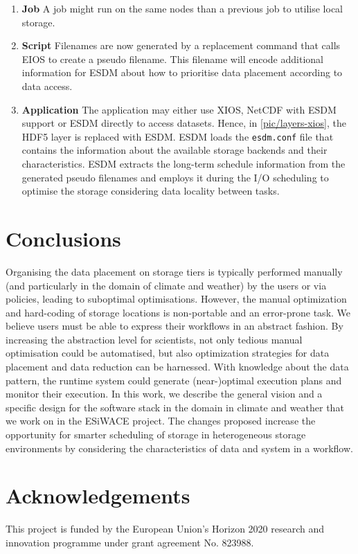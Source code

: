 \documentclass{superfri}
\newcommand{\bnl}[1]{\textcolor{green}{BNL: #1}}
\begin{document}
\begin{enumerate}
  \item \textbf{Job}
  A job might run on the same nodes than a previous job to utilise local storage.

  \item \textbf{Script}
  Filenames are now generated by a replacement command that calls EIOS to create a pseudo filename.
  This filename will encode additional information for ESDM about how to prioritise data placement according to data access.

  \item \textbf{Application}
  The application may either use XIOS, NetCDF with ESDM support or ESDM directly to access datasets.
  Hence, in \cref{pic/layers-xios}, the HDF5 layer is replaced with ESDM.
  ESDM loads the \texttt{esdm.conf} file that contains the information about the available storage backends and their characteristics.
  ESDM extracts the long-term schedule information from the generated pseudo filenames and employs it during the I/O scheduling to optimise the storage considering data locality between tasks.

\end{enumerate}

\section{Conclusions}
\label{sec:conclusions}

Organising the data placement on storage tiers is typically performed manually (and particularly in the domain of climate and weather) by the users or via policies, leading to suboptimal optimisations.
However, the manual optimization and hard-coding of storage locations is non-portable and an error-prone task.
We believe users must be able to express their workflows in an abstract fashion.
By increasing the abstraction level for scientists, not only tedious manual optimisation could be automatised, but also optimization strategies for data placement and data reduction can be harnessed.
With knowledge about the data pattern, the runtime system could generate (near-)optimal execution plans and monitor their execution.
In this work, we describe the general vision and a specific design for the software stack in the domain in climate and weather that we work on in the ESiWACE project.
The changes proposed increase the opportunity for smarter scheduling of storage in heterogeneous storage environments by considering the characteristics of data and system in a workflow.

\section*{Acknowledgements}

\small
This project is funded by the European Union's Horizon 2020 research and innovation programme under grant agreement No. 823988.

\openaccess


\end{document}
